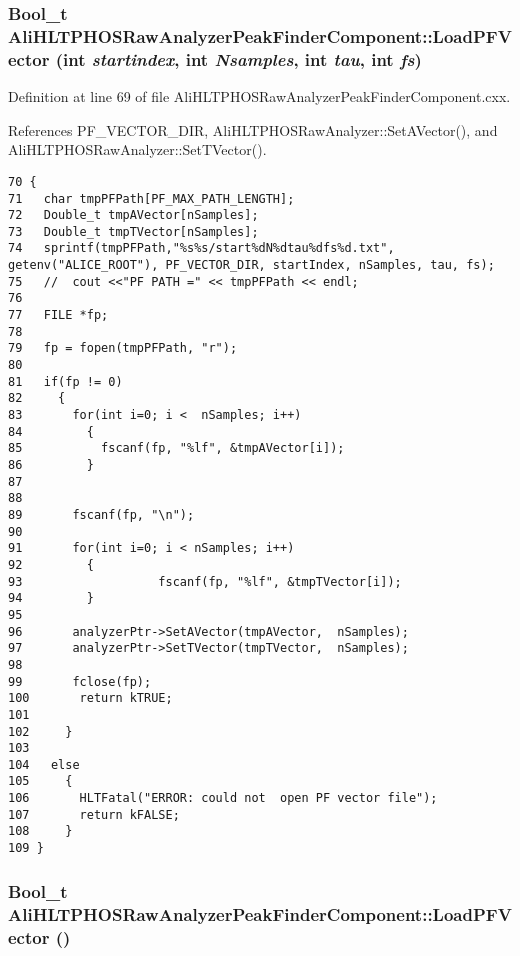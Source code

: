 \subsubsection{\setlength{\rightskip}{0pt plus 5cm}Bool\_\-t Ali\-HLTPHOSRaw\-Analyzer\-Peak\-Finder\-Component::Load\-PFVector (int {\em startindex}, int {\em Nsamples}, int {\em tau}, int {\em fs})\hspace{0.3cm}{\tt  [private]}}\label{classAliHLTPHOSRawAnalyzerPeakFinderComponent_AliHLTPHOSRawAnalyzerPeakFinderComponentd1}




Definition at line 69 of file Ali\-HLTPHOSRaw\-Analyzer\-Peak\-Finder\-Component.cxx.

References PF\_\-VECTOR\_\-DIR, Ali\-HLTPHOSRaw\-Analyzer::Set\-AVector(), and Ali\-HLTPHOSRaw\-Analyzer::Set\-TVector().

\footnotesize\begin{verbatim}70 {
71   char tmpPFPath[PF_MAX_PATH_LENGTH];
72   Double_t tmpAVector[nSamples];
73   Double_t tmpTVector[nSamples]; 
74   sprintf(tmpPFPath,"%s%s/start%dN%dtau%dfs%d.txt", getenv("ALICE_ROOT"), PF_VECTOR_DIR, startIndex, nSamples, tau, fs);
75   //  cout <<"PF PATH =" << tmpPFPath << endl;
76 
77   FILE *fp;
78 
79   fp = fopen(tmpPFPath, "r");
80   
81   if(fp != 0)
82     {
83       for(int i=0; i <  nSamples; i++)
84         {
85           fscanf(fp, "%lf", &tmpAVector[i]);
86         }
87 
88 
89       fscanf(fp, "\n");
90 
91       for(int i=0; i < nSamples; i++)
92         {
93                   fscanf(fp, "%lf", &tmpTVector[i]);
94         }
95 
96       analyzerPtr->SetAVector(tmpAVector,  nSamples);
97       analyzerPtr->SetTVector(tmpTVector,  nSamples);
98 
99       fclose(fp);
100       return kTRUE;
101 
102     }
103   
104   else
105     {
106       HLTFatal("ERROR: could not  open PF vector file");
107       return kFALSE;
108     }
109 }
\end{verbatim}\normalsize 


\subsubsection{\setlength{\rightskip}{0pt plus 5cm}Bool\_\-t Ali\-HLTPHOSRaw\-Analyzer\-Peak\-Finder\-Component::Load\-PFVector ()\hspace{0.3cm}{\tt  [private]}}\label{classAliHLTPHOSRawAnalyzerPeakFinderComponent_AliHLTPHOSRawAnalyzerPeakFinderComponentd0}




